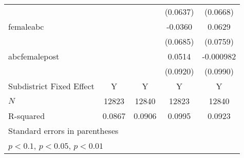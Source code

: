 {\begin{tabular}{l*{4}{c}}
            &                     &                     &    (0.0637)         &    (0.0668)         \\
\addlinespace
femaleabc   &                     &                     &     -0.0360         &      0.0629         \\
            &                     &                     &    (0.0685)         &    (0.0759)         \\
\addlinespace
abcfemalepost&                     &                     &      0.0514         &   -0.000982         \\
            &                     &                     &    (0.0920)         &    (0.0990)         \\
Subdistrict Fixed Effect & Y & Y & Y & Y \\\midrule
\(N\)       &       12823         &       12840         &       12823         &       12840         \\
R-squared   &      0.0867         &      0.0906         &      0.0995         &      0.0923         \\
\bottomrule
\multicolumn{5}{l}{\footnotesize Standard errors in parentheses}\\
\multicolumn{5}{l}{\footnotesize \sym{*} \(p<0.1\), \sym{**} \(p<0.05\), \sym{***} \(p<0.01\)}\\
\end{tabular}
}
